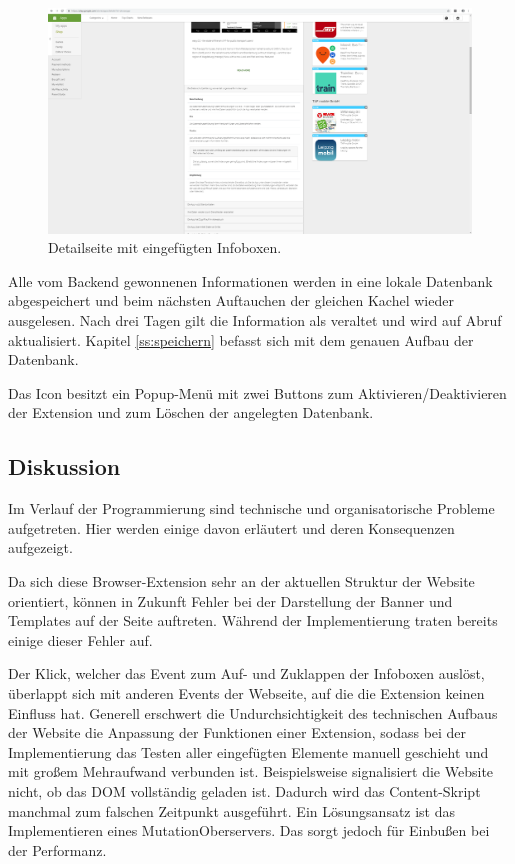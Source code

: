 \begin{figure}[H]
	\centering
	\includegraphics[width=1\textwidth]{pics/ergebnis4.png}
	\caption{Detailseite mit eingefügten Infoboxen.}
	\label{ergebnis4}
\end{figure}

Alle vom Backend gewonnenen Informationen werden in eine lokale Datenbank abgespeichert und beim nächsten Auftauchen der gleichen Kachel wieder ausgelesen. Nach drei Tagen gilt die Information als veraltet und wird auf Abruf aktualisiert. Kapitel \ref{ss:speichern} befasst sich mit dem genauen Aufbau der Datenbank.

Das Icon besitzt ein Popup-Menü mit zwei Buttons zum Aktivieren/Deaktivieren der Extension und zum Löschen der angelegten Datenbank.

\subsection{Diskussion}
\label{ss:diskussionht1}

Im Verlauf der Programmierung sind technische und organisatorische Probleme aufgetreten. Hier werden einige davon erläutert und deren Konsequenzen aufgezeigt.

Da sich diese Browser-Extension sehr an der aktuellen Struktur der Website orientiert, können in Zukunft Fehler bei der Darstellung der Banner und Templates auf der Seite auftreten. Während der Implementierung traten bereits einige dieser Fehler auf.

Der Klick, welcher das Event zum Auf- und Zuklappen der Infoboxen auslöst, überlappt sich mit anderen Events der Webseite, auf die die Extension keinen Einfluss hat. Generell erschwert die Undurchsichtigkeit des technischen Aufbaus der Website die Anpassung der Funktionen einer Extension, sodass bei der Implementierung das Testen aller eingefügten Elemente manuell geschieht und mit großem Mehraufwand verbunden ist. Beispielsweise signalisiert die Website nicht, ob das DOM vollständig geladen ist. Dadurch wird das Content-Skript manchmal zum falschen Zeitpunkt ausgeführt. Ein Lösungsansatz ist das Implementieren eines \glqq MutationOberservers\grqq{}\cite{mutation}. Das sorgt jedoch für Einbußen bei der Performanz.

